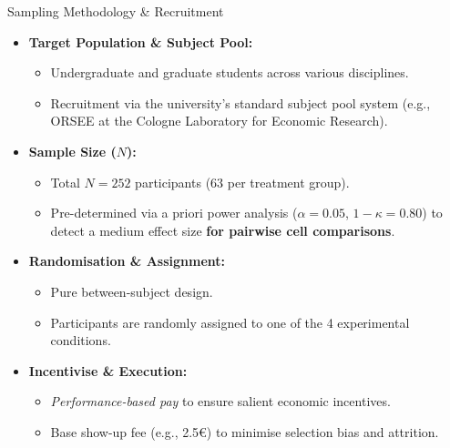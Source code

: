 \documentclass{beamer}
\begin{document}
\begin{frame}{Sampling Methodology \& Recruitment}

    \begin{itemize}
       
        \item \textbf{Target Population \& Subject Pool:} 
        \begin{itemize}
            \item Undergraduate and graduate students across various disciplines.
            \item Recruitment via the university's standard subject pool system (e.g., ORSEE at the Cologne Laboratory for Economic Research).
        \end{itemize}
        
        \item \textbf{Sample Size ($N$):}
        \begin{itemize}
            \item Total $N = 252$ participants ($63$ per treatment group).
            \item Pre-determined via a priori power analysis ($\alpha = 0.05$, $1-\kappa = 0.80$) to detect a medium effect size \textbf{for pairwise cell comparisons}.
        \end{itemize}
    
        \item \textbf{Randomisation \& Assignment:}
        \begin{itemize}
            \item Pure between-subject design.
            \item Participants are randomly assigned to one of the 4 experimental conditions.
        \end{itemize}
    
        \item \textbf{Incentivise \& Execution:}
        \begin{itemize}
            \item \textit{Performance-based pay} to ensure salient economic incentives.
            \item Base show-up fee (e.g., 2.5€) to minimise selection bias and attrition.
        \end{itemize}
    \end{itemize}

\end{frame}
\end{document}
